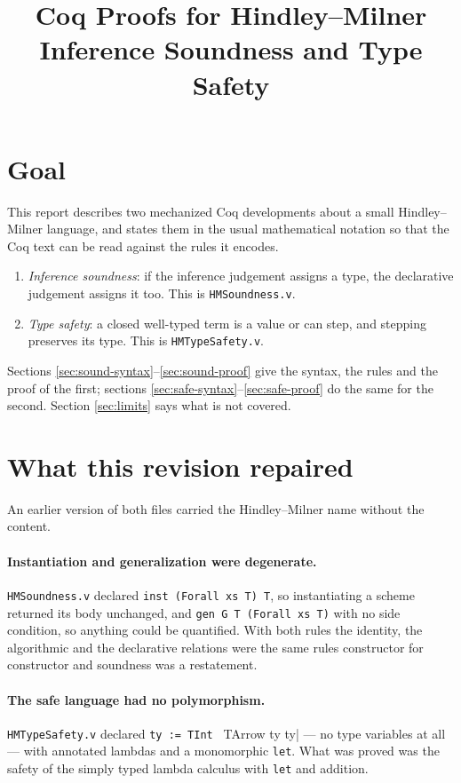 \documentclass[11pt,a4paper]{article}
\title{Coq Proofs for Hindley--Milner Inference Soundness and Type Safety}
\author{}
\date{}
\begin{document}
\maketitle

\section{Goal}

This report describes two mechanized Coq developments about a small
Hindley--Milner language, and states them in the usual mathematical notation so
that the Coq text can be read against the rules it encodes.

\begin{enumerate}
  \item \emph{Inference soundness}: if the inference judgement assigns a type,
  the declarative judgement assigns it too.  This is \texttt{HMSoundness.v}.
  \item \emph{Type safety}: a closed well-typed term is a value or can step,
  and stepping preserves its type.  This is \texttt{HMTypeSafety.v}.
\end{enumerate}

Sections \ref{sec:sound-syntax}--\ref{sec:sound-proof} give the syntax, the
rules and the proof of the first; sections
\ref{sec:safe-syntax}--\ref{sec:safe-proof} do the same for the second.
Section \ref{sec:limits} says what is not covered.

\section{What this revision repaired}

An earlier version of both files carried the Hindley--Milner name without the
content.

\paragraph{Instantiation and generalization were degenerate.}
\texttt{HMSoundness.v} declared \texttt{inst (Forall xs T) T}, so instantiating
a scheme returned its body unchanged, and \texttt{gen G T (Forall xs T)} with
no side condition, so anything could be quantified.  With both rules the
identity, the algorithmic and the declarative relations were the same rules
constructor for constructor and soundness was a restatement.

\paragraph{The safe language had no polymorphism.}
\texttt{HMTypeSafety.v} declared \verb|ty := TInt | TArrow ty ty| --- no type
variables at all --- with annotated lambdas and a monomorphic \texttt{let}.
What was proved was the safety of the simply typed lambda calculus with
\texttt{let} and addition.
\end{document}
